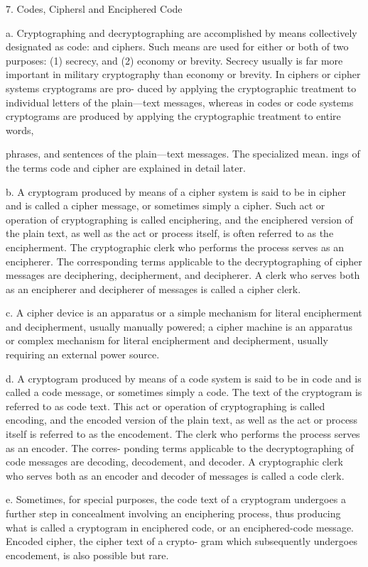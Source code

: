 7. Codes, Ciphersl and Enciphered Code

a. Cryptographing and decryptographing are accomplished by means
collectively designated as code: and ciphers. Such means are used for
either or both of two purposes: (1) secrecy, and (2) economy or brevity.
Secrecy usually is far more important in military cryptography than
economy or brevity. In ciphers or cipher systems cryptograms are pro-
duced by applying the cryptographic treatment to individual letters of
the plain—text messages, whereas in codes or code systems cryptograms
are produced by applying the cryptographic treatment to entire words,



phrases, and sentences of the plain—text messages. The specialized mean.
ings of the terms code and cipher are explained in detail later.

b. A cryptogram produced by means of a cipher system is said to be
in cipher and is called a cipher message, or sometimes simply a cipher.
Such act or operation of cryptographing is called enciphering, and the
enciphered version of the plain text, as well as the act or process itself,
is often referred to as the encipherment. The cryptographic clerk who
performs the process serves as an encipherer. The corresponding terms
applicable to the decryptographing of cipher messages are deciphering,
decipherment, and decipherer. A clerk who serves both as an encipherer
and decipherer of messages is called a cipher clerk.

c. A cipher device is an apparatus or a simple mechanism for literal
encipherment and decipherment, usually manually powered; a cipher
machine is an apparatus or complex mechanism for literal encipherment
and decipherment, usually requiring an external power source.

d. A cryptogram produced by means of a code system is said to be
in code and is called a code message, or sometimes simply a code. The
text of the cryptogram is referred to as code text. This act or operation
of cryptographing is called encoding, and the encoded version of the plain
text, as well as the act or process itself is referred to as the encodement.
The clerk who performs the process serves as an encoder. The corres-
ponding terms applicable to the decryptographing of code messages are
decoding, decodement, and decoder. A cryptographic clerk who serves
both as an encoder and decoder of messages is called a code clerk.

e. Sometimes, for special purposes, the code text of a cryptogram
undergoes a further step in concealment involving an enciphering process,
thus producing what is called a cryptogram in enciphered code, or an
enciphered-code message. Encoded cipher, the cipher text of a crypto-
gram which subsequently undergoes encodement, is also possible but rare.

